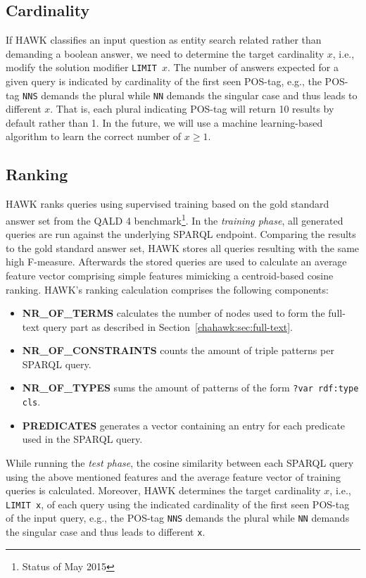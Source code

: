 \subsection{Cardinality}
If HAWK classifies an input question as entity search related rather than demanding a boolean answer, we need to determine the target cardinality $x$, i.e., modify the solution modifier \texttt{LIMIT $x$}. 
The number of answers expected for a given query is indicated by cardinality of the first seen POS-tag, e.g., the POS-tag \texttt{NNS} demands the plural while \texttt{NN} demands the singular case and thus leads to different $x$.
That is, each plural indicating POS-tag will return 10 results by default rather than 1. 
In the future, we will use a machine learning-based algorithm to learn the correct number of $x \geq 1$.

\subsection{Ranking}
HAWK ranks queries using supervised training based on the gold standard answer set from the \ac{QALD} 4 benchmark\footnote{Status of May 2015}.
In the \emph{training phase}, all generated queries are run against the underlying SPARQL endpoint. 
Comparing the results to the gold standard answer set, HAWK stores all queries resulting with the same high F-measure.
Afterwards the stored queries are used to calculate an average feature vector comprising simple features mimicking a centroid-based cosine ranking.
HAWK's ranking calculation comprises the following components:
\begin{itemize}
\item \textbf{NR\_OF\_TERMS} calculates the number of nodes used to form the full-text query part as described in Section~\ref{chahawk:sec:full-text}.
\item \textbf{NR\_OF\_CONSTRAINTS} counts the amount of triple patterns per SPARQL query.
\item \textbf{NR\_OF\_TYPES} sums the amount of patterns of the form \texttt{?var rdf:type cls}.
\item \textbf{PREDICATES} generates a vector containing an entry for each predicate used in the SPARQL query.
\end{itemize}

While running the \emph{test phase}, the cosine similarity between each SPARQL query using the above mentioned features and the average feature vector of training queries is calculated.
Moreover, HAWK determines the target cardinality $x$, i.e., \texttt{LIMIT x}, of each query using the indicated cardinality of the first seen POS-tag of the input query, e.g., the POS-tag \texttt{NNS} demands the plural while \texttt{NN} demands the singular case and thus leads to different \texttt{x}.

